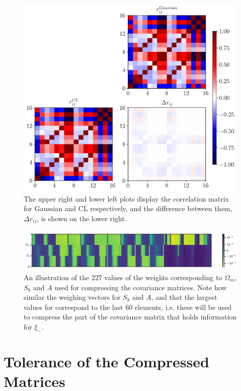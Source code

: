 \documentclass[twocolumn]{\docclass}
\begin{document}
	\begin{figure}
		\includegraphics[width=0.9\columnwidth]{Correlation_compressed.pdf}
		\caption{The upper right and lower left plots display the correlation matrix for Gaussian and CL respectively, and the difference between them, $\Delta r_{ij}$, is shown on the lower right. \label{fig:correlation}}
	\end{figure}
	
	\begin{figure}
		\includegraphics[width=2\columnwidth]{Weights.pdf}
		\caption{An illustration of the 227 values of the weights corresponding to $\Omega_m$, $S_8$ and $A$ used for compressing the covariance matrices. Note how similar the weighing vectors for $S_8$ and $A$, and that the largest values for correspond to the last 60 elements, i.e. these will be used to compress the part of the covariance matrix that holds information for $\xi_-$.} \label{fig:weight2pt}
	\end{figure}
	
	
	
	\section{Tolerance of the Compressed Matrices}
	\label{sec:tolerance}
	
\end{document}
